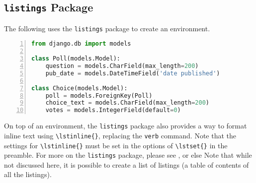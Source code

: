
\subsection{\texttt{listings} Package}

The following uses the \verb|listings| package to create an environment.

\noindent\minipage{\linewidth} %
\begin{lstlisting}[aboveskip=\baselineskip,%
                   basicstyle=\ttfamily,%
                   belowskip=\baselineskip,%
                   caption={[Listings Example]
                            \lstinline{models.py} from Django Tutorial using Listings},%
                   columns=fixed,%
                   firstnumber=1,%
                   frame=single,%
                   label=code:django:models_basic_listing,%
                   language=Python,%
                   numbers=left,%
                   showstringspaces=false,%
                   showspaces=false]
from django.db import models

class Poll(models.Model):
    question = models.CharField(max_length=200)
    pub_date = models.DateTimeField('date published')

class Choice(models.Model):
    poll = models.ForeignKey(Poll)
    choice_text = models.CharField(max_length=200)
    votes = models.IntegerField(default=0)
\end{lstlisting}
\endminipage %

On top of an environment, the \lstinline{listings} package also provides a way to format inline text using \lstinline|\lstinline{}|, replacing the \lstinline{verb} command. Note that the settings for \lstinline|\lstinline{}| must be set in the options of \lstinline|\lstset{}| in the preamble. For more on the \lstinline{listings} package, please see , or else 
Note that while not discussed here, it is possible to create a list of listings (a table of contents of all the listings).